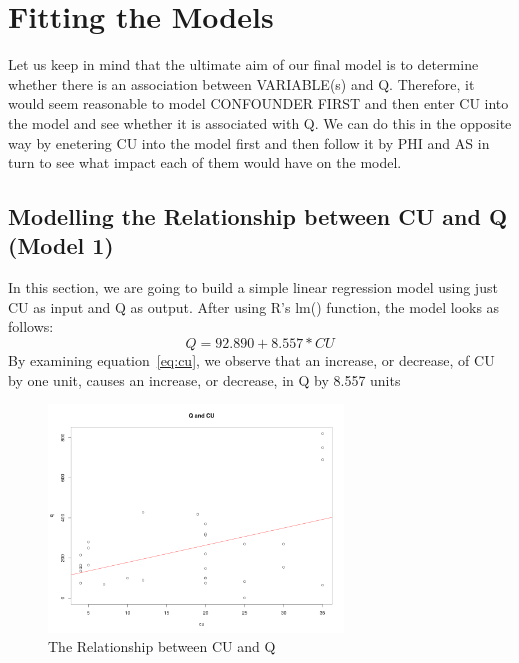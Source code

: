 \documentclass[a4paper,12pt, english]{article}
\begin{document}
\section{Fitting the Models}\label{sec:models}
Let us keep in mind that the ultimate aim of our final model is to determine whether there is an association between VARIABLE(s) and Q. 
Therefore, it would seem reasonable to model CONFOUNDER FIRST and then enter CU into the model and see whether it is associated with Q. We can do this in the opposite way by enetering CU into the model first and then follow it by PHI and AS in turn to see what impact each of them would have on the model.

\subsection{Modelling the Relationship between CU and Q (Model 1)}\label{sec:cumodel}
In this section, we are going to build a simple linear regression model using just CU as input and Q as output. After using R's lm() function, the model looks as follows:\\
\begin{equation}
\label{eq:cu}
Q = 92.890    +    8.557*CU 
\end{equation}       
By examining equation~\ref{eq:cu}, we observe that an increase, or decrease, of CU by one unit, causes an increase, or decrease, in Q by 8.557 units\\

\begin{figure}[H]
  \centering
  \includegraphics[width=0.6986\textwidth]{cu-line}
  \caption{The Relationship between CU and Q}
  \label{fig:cu-line}
\end{figure}
\end{document}
